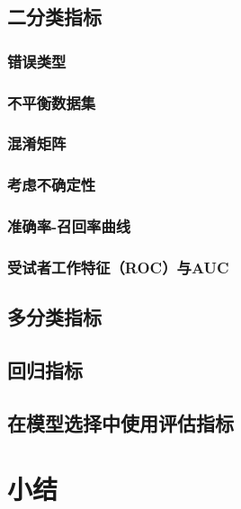 \subsection{二分类指标}
\subsubsection{错误类型}
\subsubsection{不平衡数据集}
\subsubsection{混淆矩阵}
\subsubsection{考虑不确定性}
\subsubsection{准确率-召回率曲线}
\subsubsection{受试者工作特征（ROC）与AUC}
\subsection{多分类指标}
\subsection{回归指标}
\subsection{在模型选择中使用评估指标}
\section{小结}